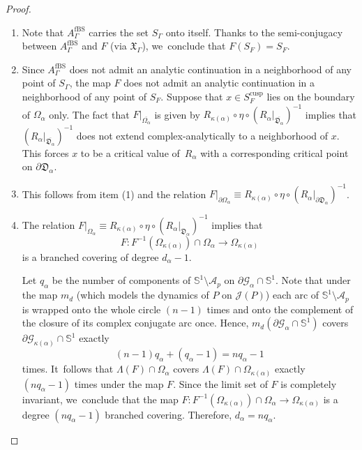 \documentclass[JEP,XML,SOM,Unicode,NoFloatCountersInSection,published]{cedram}
\theoremstyle{definition}
\theoremstyle{remark}
\begin{document}
\skpt
\begin{proof}
\begin{enumerate}
\item
Note that $A_{\Gamma}^{\mathrm{fBS}}$ carries the set $S_{\Gamma}$ onto itself. Thanks to the semi-conjugacy between $A_{\Gamma}^{\mathrm{fBS}}$ and $F$ (via $\mathfrak{X}_\Gamma$), we~conclude that $F(S_F)=S_F$.

\item
Since $A_{\Gamma}^{\mathrm{fBS}}$ does not admit an analytic continuation in a neighborhood of any point of $S_{\Gamma}$, the map $F$ does not admit an analytic continuation in a neighborhood of any point of $S_F$. Suppose that $x\in S_F^{\mathrm{cusp}}$ lies on the boundary of $\Omega_\alpha$ only.
The fact that $F\vert_{\overline{\Omega_\alpha}}$ is given by $R_{\kappa(\alpha)}\circ\eta\circ (R_\alpha\vert_{\overline{\mathfrak{D}_\alpha}})^{-1}$ implies that $(R_\alpha\vert_{\overline{\mathfrak{D}_\alpha}})^{-1}$ does not extend complex-analytically to a neighborhood of $x$. This forces $x$ to be a critical value of~$R_\alpha$ with a corresponding critical point on $\partial\mathfrak{D}_\alpha$.

\item
This follows from item (1) and the relation $F\vert_{\partial\Omega_{\alpha}}\equiv R_{\kappa(\alpha)}\circ\eta\circ(R_{\alpha}\vert_{\partial\mathfrak{D}_{\alpha}})^{-1}$.

\item
The relation $F\vert_{\Omega_{\alpha}}\equiv R_{\kappa(\alpha)}\circ\eta\circ(R_{\alpha}\vert_{\mathfrak{D}_{\alpha}})^{-1}$ implies that
\[
F:F^{-1}(\Omega_{\kappa(\alpha)})\cap\Omega_\alpha\to \Omega_{\kappa(\alpha)}
\]
is a branched covering of degree $d_\alpha-1$.

Let $q_\alpha$ be the number of components of $\mathbb{S}^1\setminus\mathcal{A}_p$ on $\partial\mathcal{G}_\alpha\cap\mathbb{S}^1$. Note that under the map $m_{d}$ (which models the dynamics of $P$ on $\mathcal{J}(P)$) each arc of $\mathbb{S}^1\setminus\mathcal{A}_p$ is wrapped onto the whole circle $(n-1)$ times and onto the complement of the closure of its complex conjugate arc once. Hence, $m_{d}(\partial\mathcal{G}_\alpha\cap\mathbb{S}^1)$ covers $\partial\mathcal{G}_{\kappa(\alpha)}\cap\mathbb{S}^1$ exactly
\[
(n-1)q_\alpha+(q_\alpha-1)=n q_\alpha-1
\]
times. It~follows that $\Lambda(F)\cap\Omega_\alpha$ covers $\Lambda(F)\cap\Omega_{\kappa(\alpha)}$ exactly $(n q_\alpha-1)$ times under the map $F$. Since the limit set of $F$ is completely invariant, we~conclude that the map \hbox{$F:F^{-1}(\Omega_{\kappa(\alpha)})\cap\Omega_\alpha\to \Omega_{\kappa(\alpha)}$} is a degree $(nq_\alpha-1)$ branched covering. Therefore, \hbox{$d_\alpha=n q_\alpha$}.\qedhere
\end{enumerate}
\end{proof}
\end{document}
